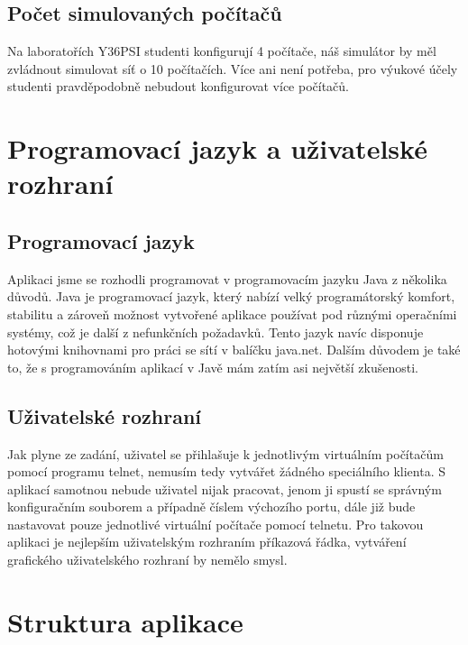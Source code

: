 \subsection{Počet simulovaných počítačů}

Na laboratořích Y36PSI studenti konfigurují 4 počítače, náš simulátor by měl zvládnout simulovat síť o 10 počítačích. Více ani není potřeba, pro výukové účely studenti pravděpodobně nebudout konfigurovat více počítačů.




\section{Programovací jazyk a uživatelské rozhraní}

\subsection{Programovací jazyk}
Aplikaci jsme se rozhodli programovat v programovacím jazyku Java z několika důvodů. Java je programovací jazyk, který nabízí velký programátorský komfort, stabilitu a zároveň možnost vytvořené aplikace používat pod různými operačními systémy, což je další z nefunkčních požadavků. Tento jazyk navíc disponuje hotovými knihovnami pro práci se sítí v balíčku java.net. Dalším důvodem je také to, že s programováním aplikací v Javě mám zatím asi největší zkušenosti.

\subsection{Uživatelské rozhraní}

Jak plyne ze zadání, uživatel se přihlašuje k jednotlivým virtuálním počítačům pomocí programu telnet, nemusím tedy vytvářet žádného speciálního klienta. S aplikací samotnou nebude uživatel nijak pracovat, jenom ji spustí se správným konfiguračním souborem a případně číslem výchozího portu, dále již bude nastavovat pouze jednotlivé virtuální počítače pomocí telnetu. Pro takovou aplikaci je nejlepším uživatelským rozhraním příkazová řádka, vytváření grafického uživatelského rozhraní by nemělo smysl.




\section{Struktura aplikace}

